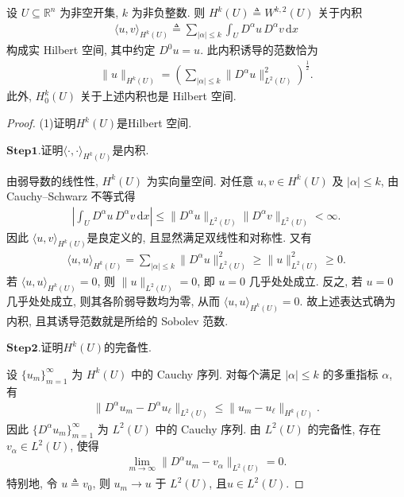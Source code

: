 \documentclass[../../main.tex]{subfiles}
\begin{document}
\begin{proposition}[$H^k(U)$ 都是Hilbert空间]\label{proposition:ch05-Hk-Hilbert-a7d3}
设 $U\subseteq\mathbb{R}^n$ 为非空开集, $k$ 为非负整数.  则 $H^k(U)\triangleq W^{k,2}(U)$ 关于内积
\begin{align*}
\langle u,v\rangle_{H^k(U)}
\triangleq
\sum\limits_{|\alpha|\leqslant k}
\int_U D^\alpha u\,D^\alpha v\,\mathrm{d}x
\end{align*}
构成实 Hilbert 空间, 其中约定 $D^0u=u$. 此内积诱导的范数恰为
\begin{align*}
\|u\|_{H^k(U)}
=
\left(
\sum\limits_{|\alpha|\leqslant k}
\|D^\alpha u\|_{L^2(U)}^2
\right)^{\frac{1}{2}}.
\end{align*}
此外, $H_0^k(U)$ 关于上述内积也是 Hilbert 空间.
\end{proposition}
\begin{proof}

(1)证明$H^k(U)$是Hilbert 空间.

\noindent$\mathbf{Step}\mathbf{1}.${\heiti 证明$\langle \cdot,\cdot\rangle_{H^k(U)}$是内积.}

由弱导数的线性性, $H^k(U)$ 为实向量空间. 对任意 $u,v\in H^k(U)$ 及 $|\alpha|\leqslant k$, 由 Cauchy--Schwarz 不等式得
\begin{align*}
\left|
\int_U D^\alpha u\,D^\alpha v\,\mathrm{d}x
\right|
\leqslant
\|D^\alpha u\|_{L^2(U)}
\|D^\alpha v\|_{L^2(U)}
<\infty.
\end{align*}
因此 $\langle u,v\rangle_{H^k(U)}$是良定义的, 且显然满足双线性和对称性. 又有
\begin{align*}
\langle u,u\rangle_{H^k(U)}
=
\sum\limits_{|\alpha|\leqslant k}
\|D^\alpha u\|_{L^2(U)}^2
\geqslant
\|u\|_{L^2(U)}^2
\geqslant 0.
\end{align*}
若 $\langle u,u\rangle_{H^k(U)}=0$, 则 $\|u\|_{L^2(U)}=0$, 即 $u=0$ 几乎处处成立. 反之, 若 $u=0$ 几乎处处成立, 则其各阶弱导数均为零, 从而 $\langle u,u\rangle_{H^k(U)}=0$. 故上述表达式确为内积, 且其诱导范数就是所给的 Sobolev 范数.

\noindent$\mathbf{Step}\mathbf{2}.${\heiti 证明$H^k(U)$的完备性.}

设 $\{u_m\}_{m=1}^{\infty}$ 为 $H^k(U)$ 中的 Cauchy 序列. 对每个满足 $|\alpha|\leqslant k$ 的多重指标 $\alpha$, 有
\begin{align*}
\|D^\alpha u_m-D^\alpha u_\ell\|_{L^2(U)}
\leqslant
\|u_m-u_\ell\|_{H^k(U)}.
\end{align*}
因此 $\{D^\alpha u_m\}_{m=1}^{\infty}$ 为 $L^2(U)$ 中的 Cauchy 序列. 由 $L^2(U)$ 的完备性, 存在 $v_\alpha\in L^2(U)$, 使得
\begin{align*}
\lim\limits_{m\to\infty}
\|D^\alpha u_m-v_\alpha\|_{L^2(U)}=0.
\end{align*}
特别地, 令 $u\triangleq v_0$, 则 $u_m\to u$ 于 $L^2(U)$, 且$u\in L^2(U)$.


\end{proof}
\end{document}
